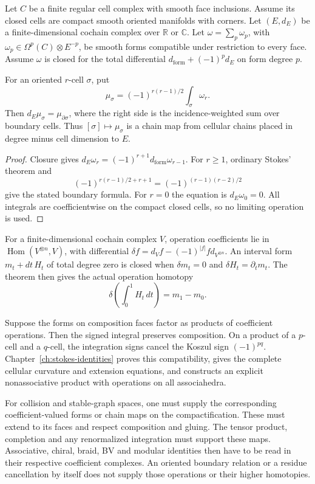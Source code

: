 \begin{theorem}\label{thm:stokes-master}
Let $C$ be a finite regular cell complex with smooth face inclusions.
Assume its closed cells are compact smooth oriented manifolds with corners.
Let $(E,d_E)$ be a finite-dimensional cochain complex over $\mathbb R$
or $\mathbb C$.
Let $\omega=\sum_p\omega_p$, with
$\omega_p\in\Omega^p(C)\otimes E^{-p}$, be smooth forms compatible
under restriction to every face.
Assume $\omega$ is closed for the total differential
$d_{\mathrm{form}}+(-1)^p d_E$ on form degree $p$.

For an oriented $r$-cell $\sigma$, put
\[
 \mu_\sigma=(-1)^{r(r-1)/2}\int_\sigma\omega_r.
\]
Then $d_E\mu_\sigma=\mu_{\partial\sigma}$, where the right side is the
incidence-weighted sum over boundary cells.
Thus $[\sigma]\mapsto\mu_\sigma$ is a chain map from cellular chains
placed in degree minus cell dimension to $E$.
\end{theorem}
\begin{proof}
Closure gives
$d_E\omega_r=(-1)^{r+1}d_{\mathrm{form}}\omega_{r-1}$.
For $r\ge1$, ordinary Stokes' theorem and
\[
 (-1)^{r(r-1)/2+r+1}=(-1)^{(r-1)(r-2)/2}
\]
give the stated boundary formula.
For $r=0$ the equation is $d_E\omega_0=0$.
All integrals are coefficientwise on the compact closed cells,
so no limiting operation is used.
\end{proof}

For a finite-dimensional cochain complex $V$, operation coefficients lie in
$\operatorname{Hom}(V^{\otimes n},V)$, with differential
$\delta f=d_Vf-(-1)^{|f|}f d_{V^{\otimes n}}$.
An interval form $m_t+dt\,H_t$ of total degree zero is closed when
$\delta m_t=0$ and $\delta H_t=\partial_t m_t$.
The theorem then gives the actual operation homotopy
\[
 \delta\left(\int_0^1 H_t\,dt\right)=m_1-m_0.
\]

Suppose the forms on composition faces factor as products of coefficient
operations.
Then the signed integral preserves composition.
On a product of a $p$-cell and a $q$-cell, the integration signs cancel
the Koszul sign $(-1)^{pq}$.
Chapter~\ref{ch:stokes-identities} proves this compatibility, gives the
complete cellular curvature and extension equations, and constructs
an explicit nonassociative product with operations on all associahedra.

For collision and stable-graph spaces, one must supply the corresponding
coefficient-valued forms or chain maps on the compactification.
These must extend to its faces and respect composition and gluing.
The tensor product, completion and any renormalized integration must
support these maps.
Associative, chiral, braid, BV and modular identities then have to be read
in their respective coefficient complexes.
An oriented boundary relation or a residue cancellation by itself
does not supply those operations or their higher homotopies.

